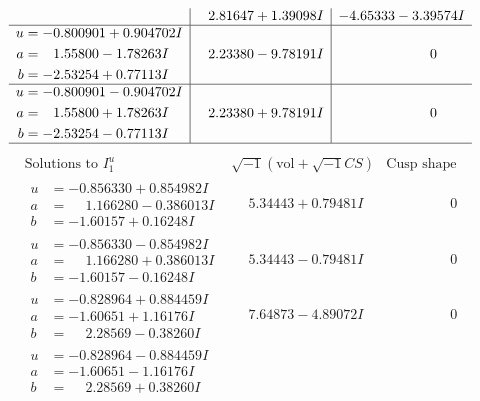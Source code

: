 \documentclass[1p]{elsarticle_modified}
\theoremstyle{definition}
\newcommand{\I}{\sqrt{-1}}
\begin{document}
$$\begin{array}{c|c|c}
 & \phantom{-}2.81647 + 1.39098 I & -4.65333 - 3.39574 I \\ \hline\begin{aligned}
u &= -0.800901 + 0.904702 I \\
a &= \phantom{-}1.55800 - 1.78263 I \\
b &= -2.53254 + 0.77113 I\end{aligned}
 & \phantom{-}2.23380 - 9.78191 I & \phantom{-0.000000 } 0 \\ \hline\begin{aligned}
u &= -0.800901 - 0.904702 I \\
a &= \phantom{-}1.55800 + 1.78263 I \\
b &= -2.53254 - 0.77113 I\end{aligned}
 & \phantom{-}2.23380 + 9.78191 I & \phantom{-0.000000 } 0\\
 \hline 
 \end{array}$$\newpage$$\begin{array}{c|c|c}  
\text{Solutions to }I^u_{1}& \I (\text{vol} + \sqrt{-1}CS) & \text{Cusp shape}\\
 \hline 
\begin{aligned}
u &= -0.856330 + 0.854982 I \\
a &= \phantom{-}1.166280 - 0.386013 I \\
b &= -1.60157 + 0.16248 I\end{aligned}
 & \phantom{-}5.34443 + 0.79481 I & \phantom{-0.000000 } 0 \\ \hline\begin{aligned}
u &= -0.856330 - 0.854982 I \\
a &= \phantom{-}1.166280 + 0.386013 I \\
b &= -1.60157 - 0.16248 I\end{aligned}
 & \phantom{-}5.34443 - 0.79481 I & \phantom{-0.000000 } 0 \\ \hline\begin{aligned}
u &= -0.828964 + 0.884459 I \\
a &= -1.60651 + 1.16176 I \\
b &= \phantom{-}2.28569 - 0.38260 I\end{aligned}
 & \phantom{-}7.64873 - 4.89072 I & \phantom{-0.000000 } 0 \\ \hline\begin{aligned}
u &= -0.828964 - 0.884459 I \\
a &= -1.60651 - 1.16176 I \\
b &= \phantom{-}2.28569 + 0.38260 I\end{aligned}

\end{array}$$
\end{document}
